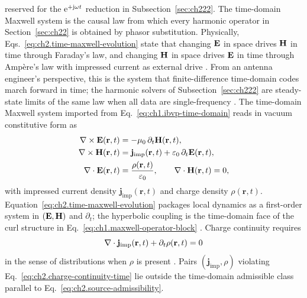 reserved for the $\mathrm{e}^{+\mathrm{j}\omega t}$ reduction in Subsection~\ref{sec:ch222}. The time-domain Maxwell
system is the causal law from which every harmonic operator in Section~\ref{sec:ch22} is
obtained by phasor substitution. Physically, Eqs.~\eqref{eq:ch2.time-maxwell-evolution}
state that changing $\mathbf{E}$ in space drives $\mathbf{H}$ in time through Faraday's law, and changing
$\mathbf{H}$ in space drives $\mathbf{E}$ in time through Amp\`ere's law with impressed current as external
drive \cite{maxwell1873}. From an antenna engineer's perspective, this is the
system that finite-difference time-domain codes march forward in time; the harmonic solvers
of Subsection~\ref{sec:ch222} are steady-state limits of the same law when all data are
single-frequency \cite{harrington2001}. The time-domain Maxwell system imported from
Eq.~\eqref{eq:ch1.ibvp-time-domain} reads in vacuum constitutive form as
\begin{equation}
\label{eq:ch2.time-maxwell-evolution}
\begin{aligned}
\nabla\times\mathbf{E}(\mathbf{r},t)&=-\mu_0\,\partial_t\mathbf{H}(\mathbf{r},t),\\
\nabla\times\mathbf{H}(\mathbf{r},t)&=\mathbf{j}_{\mathrm{imp}}(\mathbf{r},t)+\varepsilon_0\,\partial_t\mathbf{E}(\mathbf{r},t),\\
\nabla\cdot\mathbf{E}(\mathbf{r},t)&=\frac{\rho(\mathbf{r},t)}{\varepsilon_0},\qquad
\nabla\cdot\mathbf{H}(\mathbf{r},t)=0,
\end{aligned}
\end{equation}
with impressed current density \(\mathbf{j}_{\mathrm{imp}}(\mathbf{r},t)\) and charge
density \(\rho(\mathbf{r},t)\). Equation~\eqref{eq:ch2.time-maxwell-evolution}
packages local dynamics as a first-order system in \((\mathbf{E},\mathbf{H})\) and \(\partial_t\);
the hyperbolic coupling is the time-domain face of the curl structure in
Eq.~\eqref{eq:ch1.maxwell-operator-block} \cite{stratton1941}. Charge continuity
requires
\begin{equation}
\label{eq:ch2.charge-continuity-time}
\nabla\cdot\mathbf{j}_{\mathrm{imp}}(\mathbf{r},t)+\partial_t\rho(\mathbf{r},t)=0
\end{equation}
in the sense of distributions when \(\rho\) is present \cite{stratton1941}. Pairs
\((\mathbf{j}_{\mathrm{imp}},\rho)\) violating
Eq.~\eqref{eq:ch2.charge-continuity-time} lie outside the time-domain admissible
class parallel to Eq.~\eqref{eq:ch2.source-admissibility}.
